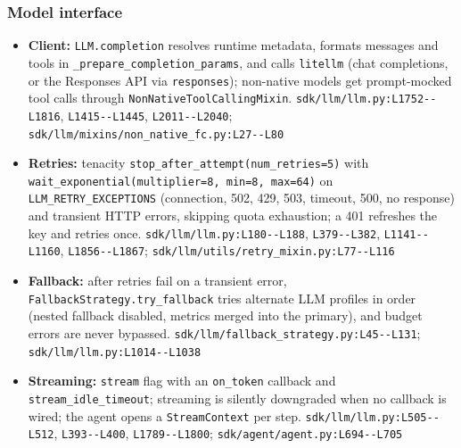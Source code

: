 \subsubsection*{Model interface}
\begin{itemize}
\item \textbf{Client:} \texttt{LLM.\allowbreak{}completion} resolves runtime metadata, formats messages and tools in \texttt{\_\allowbreak{}prepare\_\allowbreak{}completion\_\allowbreak{}params}, and calls \texttt{litellm} (chat completions, or the Responses API via \texttt{responses}); non-native models get prompt-mocked tool calls through \texttt{NonNativeToolCallingMixin}. \texttt{sdk/\allowbreak{}llm/\allowbreak{}llm.\allowbreak{}py:\allowbreak{}L1752-\allowbreak{}-\allowbreak{}L1816}, \texttt{L1415-\allowbreak{}-\allowbreak{}L1445}, \texttt{L2011-\allowbreak{}-\allowbreak{}L2040}; \texttt{sdk/\allowbreak{}llm/\allowbreak{}mixins/\allowbreak{}non\_\allowbreak{}native\_\allowbreak{}fc.\allowbreak{}py:\allowbreak{}L27-\allowbreak{}-\allowbreak{}L80}
\item \textbf{Retries:} tenacity \texttt{stop\_\allowbreak{}after\_\allowbreak{}attempt(\allowbreak{}num\_\allowbreak{}retries=5)} with \texttt{wait\_\allowbreak{}exponential(\allowbreak{}multiplier=8, min=8, max=64)} on \texttt{LLM\_\allowbreak{}RETRY\_\allowbreak{}EXCEPTIONS} (connection, 502, 429, 503, timeout, 500, no response) and transient HTTP errors, skipping quota exhaustion; a 401 refreshes the key and retries once. \texttt{sdk/\allowbreak{}llm/\allowbreak{}llm.\allowbreak{}py:\allowbreak{}L180-\allowbreak{}-\allowbreak{}L188}, \texttt{L379-\allowbreak{}-\allowbreak{}L382}, \texttt{L1141-\allowbreak{}-\allowbreak{}L1160}, \texttt{L1856-\allowbreak{}-\allowbreak{}L1867}; \texttt{sdk/\allowbreak{}llm/\allowbreak{}utils/\allowbreak{}retry\_\allowbreak{}mixin.\allowbreak{}py:\allowbreak{}L77-\allowbreak{}-\allowbreak{}L116}
\item \textbf{Fallback:} after retries fail on a transient error, \texttt{FallbackStrategy.\allowbreak{}try\_\allowbreak{}fallback} tries alternate LLM profiles in order (nested fallback disabled, metrics merged into the primary), and budget errors are never bypassed. \texttt{sdk/\allowbreak{}llm/\allowbreak{}fallback\_\allowbreak{}strategy.\allowbreak{}py:\allowbreak{}L45-\allowbreak{}-\allowbreak{}L131}; \texttt{sdk/\allowbreak{}llm/\allowbreak{}llm.\allowbreak{}py:\allowbreak{}L1014-\allowbreak{}-\allowbreak{}L1038}
\item \textbf{Streaming:} \texttt{stream} flag with an \texttt{on\_\allowbreak{}token} callback and \texttt{stream\_\allowbreak{}idle\_\allowbreak{}timeout}; streaming is silently downgraded when no callback is wired; the agent opens a \texttt{StreamContext} per step. \texttt{sdk/\allowbreak{}llm/\allowbreak{}llm.\allowbreak{}py:\allowbreak{}L505-\allowbreak{}-\allowbreak{}L512}, \texttt{L393-\allowbreak{}-\allowbreak{}L400}, \texttt{L1789-\allowbreak{}-\allowbreak{}L1800}; \texttt{sdk/\allowbreak{}agent/\allowbreak{}agent.\allowbreak{}py:\allowbreak{}L694-\allowbreak{}-\allowbreak{}L705}
\end{itemize}

